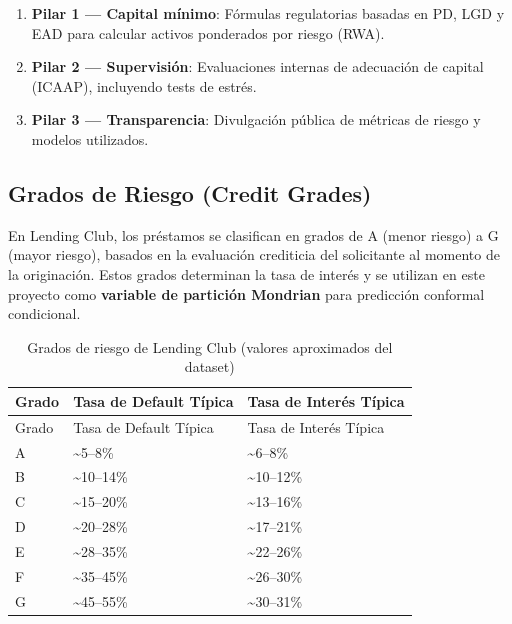 \documentclass[
  spanish,
  11pt,
  letterpaper,
]{scrbook}
\providecommand{\tightlist}{%
  \setlength{\itemsep}{0pt}\setlength{\parskip}{0pt}}
\theoremstyle{plain}
\theoremstyle{remark}
\begin{document}
\begin{enumerate}
\def\labelenumi{\arabic{enumi}.}
\tightlist
\item
  \textbf{Pilar 1 --- Capital mínimo}: Fórmulas regulatorias basadas en
  PD, LGD y EAD para calcular activos ponderados por riesgo (RWA).
\item
  \textbf{Pilar 2 --- Supervisión}: Evaluaciones internas de adecuación
  de capital (ICAAP), incluyendo tests de estrés.
\item
  \textbf{Pilar 3 --- Transparencia}: Divulgación pública de métricas de
  riesgo y modelos utilizados.
\end{enumerate}

\subsection{Grados de Riesgo (Credit
Grades)}\label{grados-de-riesgo-credit-grades}

En Lending Club, los préstamos se clasifican en grados de A (menor
riesgo) a G (mayor riesgo), basados en la evaluación crediticia del
solicitante al momento de la originación. Estos grados determinan la
tasa de interés y se utilizan en este proyecto como \textbf{variable de
partición Mondrian} para predicción conformal condicional.

\begin{longtable}[]{@{}lll@{}}
\caption{Grados de riesgo de Lending Club (valores aproximados del
dataset)}\label{tbl-credit-grades}\tabularnewline
\toprule\noalign{}
Grado & Tasa de Default Típica & Tasa de Interés Típica \\
\midrule\noalign{}
\endfirsthead
\toprule\noalign{}
Grado & Tasa de Default Típica & Tasa de Interés Típica \\
\midrule\noalign{}
\endhead
\bottomrule\noalign{}
\endlastfoot
A & \textasciitilde5--8\% & \textasciitilde6--8\% \\
B & \textasciitilde10--14\% & \textasciitilde10--12\% \\
C & \textasciitilde15--20\% & \textasciitilde13--16\% \\
D & \textasciitilde20--28\% & \textasciitilde17--21\% \\
E & \textasciitilde28--35\% & \textasciitilde22--26\% \\
F & \textasciitilde35--45\% & \textasciitilde26--30\% \\
G & \textasciitilde45--55\% & \textasciitilde30--31\% \\
\end{longtable}
\end{document}
